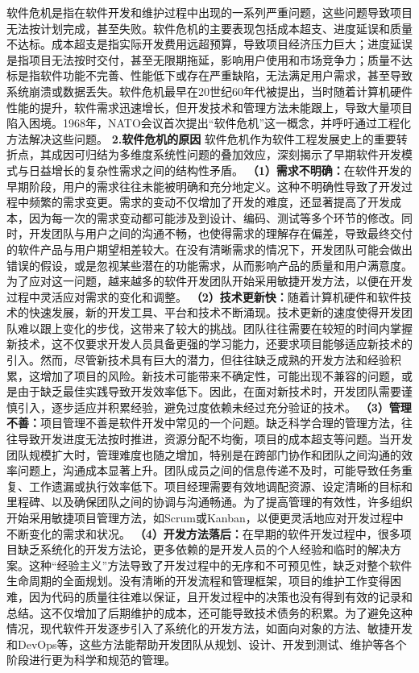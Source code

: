{软件危机是指在软件开发和维护过程中出现的一系列严重问题，这些问题导致项目无法按计划完成，甚至失败。软件危机的主要表现包括成本超支、进度延误和质量不达标。成本超支是指实际开发费用远超预算，导致项目经济压力巨大；进度延误是指项目无法按时交付，甚至无限期拖延，影响用户使用和市场竞争力；质量不达标是指软件功能不完善、性能低下或存在严重缺陷，无法满足用户需求，甚至导致系统崩溃或数据丢失。软件危机最早在20世纪60年代被提出，当时随着计算机硬件性能的提升，软件需求迅速增长，但开发技术和管理方法未能跟上，导致大量项目陷入困境。1968年，NATO会议首次提出``软件危机''这一概念，并呼吁通过工程化方法解决这些问题。 \textbf{2.软件危机的原因} 软件危机作为软件工程发展史上的重要转折点，其成因可归结为多维度系统性问题的叠加效应，深刻揭示了早期软件开发模式与日益增长的复杂性需求之间的结构性矛盾。 \textbf{（1）需求不明确：}在软件开发的早期阶段，用户的需求往往未能被明确和充分地定义。这种不明确性导致了开发过程中频繁的需求变更。需求的变动不仅增加了开发的难度，还显著提高了开发成本，因为每一次的需求变动都可能涉及到设计、编码、测试等多个环节的修改。同时，开发团队与用户之间的沟通不畅，也使得需求的理解存在偏差，导致最终交付的软件产品与用户期望相差较大。在没有清晰需求的情况下，开发团队可能会做出错误的假设，或是忽视某些潜在的功能需求，从而影响产品的质量和用户满意度。为了应对这一问题，越来越多的软件开发团队开始采用敏捷开发方法，以便在开发过程中灵活应对需求的变化和调整。 \textbf{（2）技术更新快：}随着计算机硬件和软件技术的快速发展，新的开发工具、平台和技术不断涌现。技术更新的速度使得开发团队难以跟上变化的步伐，这带来了较大的挑战。团队往往需要在较短的时间内掌握新技术，这不仅要求开发人员具备更强的学习能力，还要求项目能够适应新技术的引入。然而，尽管新技术具有巨大的潜力，但往往缺乏成熟的开发方法和经验积累，这增加了项目的风险。新技术可能带来不确定性，可能出现不兼容的问题，或是由于缺乏最佳实践导致开发效率低下。因此，在面对新技术时，开发团队需要谨慎引入，逐步适应并积累经验，避免过度依赖未经过充分验证的技术。 \textbf{（3）管理不善：}项目管理不善是软件开发中常见的一个问题。缺乏科学合理的管理方法，往往导致开发进度无法按时推进，资源分配不均衡，项目的成本超支等问题。当开发团队规模扩大时，管理难度也随之增加，特别是在跨部门协作和团队之间沟通的效率问题上，沟通成本显著上升。团队成员之间的信息传递不及时，可能导致任务重复、工作遗漏或执行效率低下。项目经理需要有效地调配资源、设定清晰的目标和里程碑、以及确保团队之间的协调与沟通畅通。为了提高管理的有效性，许多组织开始采用敏捷项目管理方法，如Scrum或Kanban，以便更灵活地应对开发过程中不断变化的需求和状况。 \textbf{（4）开发方法落后：}在早期的软件开发过程中，很多项目缺乏系统化的开发方法论，更多依赖的是开发人员的个人经验和临时的解决方案。这种``经验主义''方法导致了开发过程中的无序和不可预见性，缺乏对整个软件生命周期的全面规划。没有清晰的开发流程和管理框架，项目的维护工作变得困难，因为代码的质量往往难以保证，且开发过程中的决策也没有得到有效的记录和总结。这不仅增加了后期维护的成本，还可能导致技术债务的积累。为了避免这种情况，现代软件开发逐步引入了系统化的开发方法，如面向对象的方法、敏捷开发和DevOps等，这些方法能帮助开发团队从规划、设计、开发到测试、维护等各个阶段进行更为科学和规范的管理。 }

